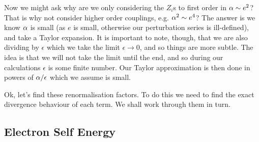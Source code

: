 \br 
    Now we might ask why are we only considering the $Z_i$s to first order in $\alpha \sim e^2$? That is why not consider higher order couplings, e.g. $\alpha^2\sim e^4$? The answer is we know $\alpha$ is small (as $e$ is small, otherwise our perturbation series is ill-defined), and take a Taylor expansion. It is important to note, though, that we are also dividing by $\epsilon$ which we take the limit $\epsilon\to 0$, and so things are more subtle. The idea is that we will not take the limit until the end, and so during our calculations $\epsilon$ is some finite number. Our Taylor approximation is then done in powers of $\alpha/\epsilon$ which we assume is small. 
\er 

Ok, let's find these renormalisation factors. To do this we need to find the exact divergence behaviour of each term. We shall work through them in turn. 

\subsection{Electron Self Energy}


